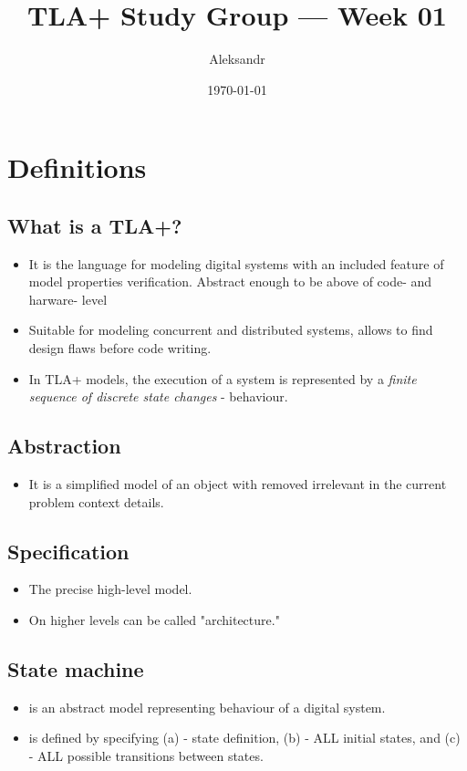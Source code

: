 \documentclass[11pt]{article}
\title{TLA+ Study Group — Week 01}
\author{Aleksandr}
\date{\today}
\begin{document}
\maketitle

\section*{Definitions}

\subsection{What is a TLA+?}
\begin{itemize}
\item It is the language for modeling digital systems with an included feature of model properties verification. Abstract enough to be above of code- and harware- level
\item Suitable for modeling concurrent and distributed systems, allows to find design flaws before code writing.
\item In TLA+ models, the execution of a system is represented by a \textit{finite sequence of discrete state changes} - behaviour.
\end{itemize}

\subsection{Abstraction}
\begin{itemize}
\item It is a simplified model of an object with removed irrelevant in the current problem context details.
\end{itemize}

\subsection{Specification}
\begin{itemize}
\item The precise high-level model.
\item  On higher levels can be called "architecture."
\end{itemize}

\subsection{State machine}
\begin{itemize}
\item is an abstract model representing behaviour of a digital system.
\item is defined by specifying (a) - state definition, (b) - ALL initial states, and (c) - ALL possible transitions between states.
\end{itemize}
\end{document}
